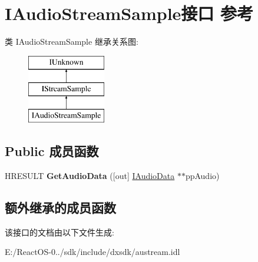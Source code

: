 \hypertarget{interface_i_audio_stream_sample}{}\section{I\+Audio\+Stream\+Sample接口 参考}
\label{interface_i_audio_stream_sample}
类 I\+Audio\+Stream\+Sample 继承关系图\+:\begin{figure}[H]
\begin{center}
\leavevmode
\includegraphics[height=3.000000cm]{interface_i_audio_stream_sample}
\end{center}
\end{figure}
\subsection*{Public 成员函数}
\begin{DoxyCompactItemize}
\item 
\mbox{\label{interface_i_audio_stream_sample_a29fbed70793a883750f3cd3f9b78dae1}} 
H\+R\+E\+S\+U\+LT {\bfseries Get\+Audio\+Data} (\mbox{[}out\mbox{]} \hyperlink{interface_i_audio_data}{I\+Audio\+Data} $\ast$$\ast$pp\+Audio)
\end{DoxyCompactItemize}
\subsection*{额外继承的成员函数}


该接口的文档由以下文件生成\+:\begin{DoxyCompactItemize}
\item 
E\+:/\+React\+O\+S-\/0../sdk/include/dxsdk/austream.\+idl\end{DoxyCompactItemize}
